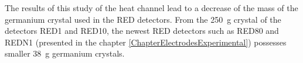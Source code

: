 The results of this study of the heat channel lead to a decrease of the mass of the germanium crystal used in the RED detectors. From the \SI{250}{\g} crystal of the detectors RED1 and RED10, the newest RED detectors such as RED80 and REDN1 (presented in the chapter \ref{ChapterElectrodesExperimental}) possesses smaller \SI{38}{\g} germanium crystals. 


%

